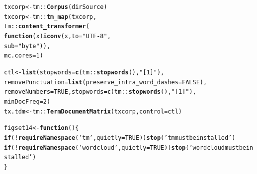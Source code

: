 \documentclass[12pt, a4paper,  BCOR=8.25mm, DIV=15]{scrartcl}\usepackage[]{graphicx}\usepackage[]{color}
\makeatletter
\newcommand{\hlnum}[1]{\textcolor[rgb]{0.686,0.059,0.569}{#1}}%
\newcommand{\hlstr}[1]{\textcolor[rgb]{0.192,0.494,0.8}{#1}}%
\newcommand{\hlopt}[1]{\textcolor[rgb]{0,0,0}{#1}}%
\newcommand{\hlstd}[1]{\textcolor[rgb]{0.345,0.345,0.345}{#1}}%
\newcommand{\hlkwa}[1]{\textcolor[rgb]{0.161,0.373,0.58}{\textbf{#1}}}%
\newcommand{\hlkwb}[1]{\textcolor[rgb]{0.69,0.353,0.396}{#1}}%
\newcommand{\hlkwc}[1]{\textcolor[rgb]{0.333,0.667,0.333}{#1}}%
\newcommand{\hlkwd}[1]{\textcolor[rgb]{0.737,0.353,0.396}{\textbf{#1}}}%
\newenvironment{kframe}{%
 \def\at@end@of@kframe{}%
 \ifinner\ifhmode%
  \def\at@end@of@kframe{\end{minipage}}%
  \begin{minipage}{\columnwidth}%
 \fi\fi%
 \def\FrameCommand##1{\hskip\@totalleftmargin \hskip-\fboxsep
 \colorbox{shadecolor}{##1}\hskip-\fboxsep
     \hskip-\linewidth \hskip-\@totalleftmargin \hskip\columnwidth}%
 \MakeFramed {\advance\hsize-\width
   \@totalleftmargin\z@ \linewidth\hsize
   \@setminipage}}%
 {\par\unskip\endMakeFramed%
 \at@end@of@kframe}
\newenvironment{knitrout}{}{} %
\makeatother
\begin{document}
\begin{knitrout}
\color{fgcolor}\begin{kframe}
\begin{alltt}
\hlstd{txcorp} \hlkwb{<-} \hlstd{tm}\hlopt{::}\hlkwd{Corpus}\hlstd{(dirSource)}
\hlstd{txcorp} \hlkwb{<-} \hlstd{tm}\hlopt{::}\hlkwd{tm_map}\hlstd{(txcorp,}
                 \hlstd{tm}\hlopt{::}\hlkwd{content_transformer}\hlstd{(}
                     \hlkwa{function}\hlstd{(}\hlkwc{x}\hlstd{)} \hlkwd{iconv}\hlstd{(x,} \hlkwc{to}\hlstd{=}\hlstr{"UTF-8"}\hlstd{,}
                                       \hlkwc{sub} \hlstd{=} \hlstr{"byte"}\hlstd{)),}
                 \hlkwc{mc.cores}\hlstd{=}\hlnum{1}\hlstd{)}
\end{alltt}
\end{kframe}
\end{knitrout}
\begin{knitrout}
\color{fgcolor}\begin{kframe}
\begin{alltt}
\hlstd{ctl} \hlkwb{<-} \hlkwd{list}\hlstd{(}\hlkwc{stopwords} \hlstd{=} \hlkwd{c}\hlstd{(tm}\hlopt{::}\hlkwd{stopwords}\hlstd{(),} \hlstr{"[1]"}\hlstd{),}
            \hlkwc{removePunctuation} \hlstd{=} \hlkwd{list}\hlstd{(}\hlkwc{preserve_intra_word_dashes} \hlstd{=} \hlnum{FALSE}\hlstd{),}
            \hlkwc{removeNumbers} \hlstd{=} \hlnum{TRUE}\hlstd{,} \hlkwc{stopwords}\hlstd{=}\hlkwd{c}\hlstd{(tm}\hlopt{::}\hlkwd{stopwords}\hlstd{(),} \hlstr{"[1]"}\hlstd{),}
            \hlkwc{minDocFreq} \hlstd{=} \hlnum{2}\hlstd{)}
\hlstd{tx.tdm} \hlkwb{<-} \hlstd{tm}\hlopt{::}\hlkwd{TermDocumentMatrix}\hlstd{(txcorp,} \hlkwc{control}\hlstd{=ctl)}
\end{alltt}
\end{kframe}
\end{knitrout}
\begin{knitrout}
\color{fgcolor}\begin{kframe}
\begin{alltt}
\hlstd{figset14} \hlkwb{<-} \hlkwa{function}\hlstd{()\{}
  \hlkwa{if}\hlstd{(}\hlopt{!}\hlkwd{requireNamespace}\hlstd{(}\hlstr{'tm'}\hlstd{,} \hlkwc{quietly} \hlstd{=} \hlnum{TRUE}\hlstd{))}\hlkwd{stop}\hlstd{(}\hlstr{'tm must be installed'}\hlstd{)}
  \hlkwa{if}\hlstd{(}\hlopt{!}\hlkwd{requireNamespace}\hlstd{(}\hlstr{'wordcloud'}\hlstd{,} \hlkwc{quietly}\hlstd{=}\hlnum{TRUE}\hlstd{))}\hlkwd{stop}\hlstd{(}\hlstr{'wordcloud must be installed'}\hlstd{)}
  \hlstd{\}}
\end{alltt}
\end{kframe}
\end{knitrout}
\end{document}
